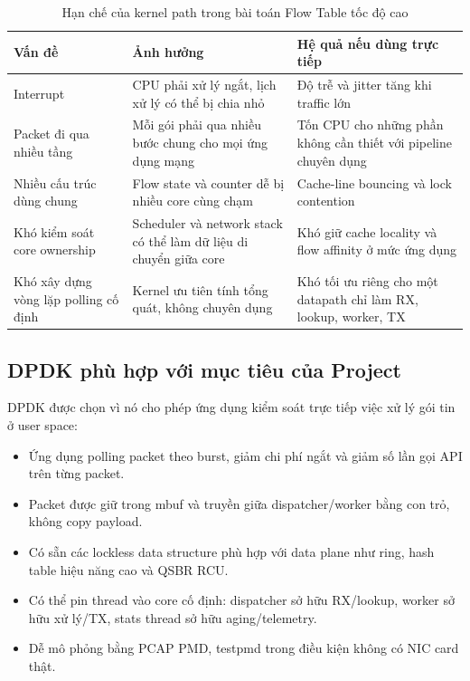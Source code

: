\documentclass[12pt,a4paper]{report}
\begin{document}
\begin{table}[H]
\centering
\footnotesize
\caption{Hạn chế của kernel path trong bài toán Flow Table tốc độ cao}
\label{tab:kernel_limit}
\begin{tabularx}{\textwidth}{|L{4.0cm}|Y|Y|}
\hline
\textbf{Vấn đề} & \textbf{Ảnh hưởng} & \textbf{Hệ quả nếu dùng trực tiếp} \\
\hline
Interrupt & CPU phải xử lý ngắt, lịch xử lý có thể bị chia nhỏ & Độ trễ và jitter tăng khi traffic lớn \\
\hline
Packet đi qua nhiều tầng & Mỗi gói phải qua nhiều bước chung cho mọi ứng dụng mạng & Tốn CPU cho những phần không cần thiết với pipeline chuyên dụng \\
\hline
Nhiều cấu trúc dùng chung & Flow state và counter dễ bị nhiều core cùng chạm & Cache-line bouncing và lock contention \\
\hline
Khó kiểm soát core ownership & Scheduler và network stack có thể làm dữ liệu di chuyển giữa core & Khó giữ cache locality và flow affinity ở mức ứng dụng \\
\hline
Khó xây dựng vòng lặp polling cố định & Kernel ưu tiên tính tổng quát, không chuyên dụng & Khó tối ưu riêng cho một datapath chỉ làm RX, lookup, worker, TX \\
\hline
\end{tabularx}
\end{table}

\subsection{DPDK phù hợp với mục tiêu của Project}

DPDK được chọn vì nó cho phép ứng dụng kiểm soát trực tiếp việc xử lý gói tin ở user space:

\begin{itemize}
    \item Ứng dụng polling packet theo burst, giảm chi phí ngắt và giảm số lần gọi API trên từng packet.
    \item Packet được giữ trong mbuf và truyền giữa dispatcher/worker bằng con trỏ, không copy payload.
    \item Có sẵn các lockless data structure phù hợp với data plane như ring, hash table hiệu năng cao và QSBR RCU.
    \item Có thể pin thread vào core cố định: dispatcher sở hữu RX/lookup, worker sở hữu xử lý/TX, stats thread sở hữu aging/telemetry.
    \item Dễ mô phỏng bằng PCAP PMD, testpmd trong điều kiện không có NIC card thật.
\end{itemize}
\end{document}
